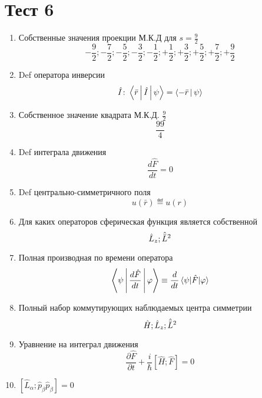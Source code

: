 \section*{Тест 6}
\begin{enumerate}
    \item Собственные значения проекции М.К.Д для $s=\frac{9}{2}$
        $$-\frac{9}{2};-\frac{7}{2};-\frac{5}{2};-\frac{3}{2};-\frac{1}{2};
        +\frac{1}{2};+\frac{3}{2};+\frac{5}{2};+\frac{7}{2};+\frac{9}{2}$$
    \item Def оператора инверсии
        $$\hat I\colon 
	\Braket{\bar r | \hat I | \psi} = \Braket{-\bar r | \psi}$$
    \item Собственное значение квадрата М.К.Д. $\frac{9}{2}$
        $$\frac{99}{4}$$
    \item Def интеграла движения
        $$\frac{d\hat F}{dt}=0$$
    \item Def центрально-симметричного поля
        $$u(\bar r)\eqdef u(r)$$
    \item Для каких операторов сферическая функция является собственной
        $$\Hat L_z; \Hat{\bar L}^2$$
    \item Полная производная по времени оператора
        $$\Braket{\psi|\frac{d\hat F}{dt}|\varphi}\equiv\frac{d}{dt}\braket{\psi|\hat F|\varphi}$$
    \item Полный набор коммутирующих наблюдаемых центра симметрии
        $$\hat H; \hat L_z; \Hat{\bar L} ^2$$
    \item Уравнение на интеграл движения
        $$\frac{\partial\hat F}{\partial t}+\frac{i}{\hbar}[\hat H;\hat F] = 0$$
    \item $[\hat L_\alpha; \hat p_\beta \hat p_\beta]=0$
\end{enumerate}
